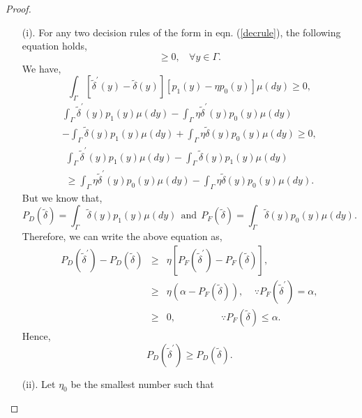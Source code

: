 \documentclass[a4paper,english,12pt]{article}
\begin{document}
\begin{proof}{}
\begin{itemize}
\item[(i).] For any two decision rules of the form in eqn. (\ref{decrule}), the following equation holds,
\begin{equation}
[\tilde{\delta}^{'} (y) - \tilde{\delta} (y) ][p_1(y) - \eta p_0(y)] \geq 0, ~~~~ \forall y\in \Gamma.
\end{equation}
We have,
\begin{equation}
\int_{\Gamma} [\tilde{\delta}^{'} (y) - \tilde{\delta} (y) ][p_1(y) - \eta p_0(y)]  \mu (dy) \geq 0, 
\end{equation}
\begin{multline}
\int_{\Gamma} \tilde{\delta}^{'} (y) p_1(y)  \mu (dy) - \int_{\Gamma} \eta \tilde{\delta}^{'} (y) p_0(y)  \mu (dy) \nonumber \\
- \int_{\Gamma} \tilde{\delta} (y) p_1(y)  \mu (dy) + \int_{\Gamma} \eta \tilde{\delta} (y) p_0(y)  \mu (dy) \geq 0,
\end{multline}
\begin{multline}
\int_{\Gamma} \tilde{\delta}^{'} (y) p_1(y)  \mu (dy) - \int_{\Gamma} \tilde{\delta} (y) p_1(y)  \mu (dy)  \\
\geq  \int_{\Gamma} \eta \tilde{\delta}^{'} (y) p_0(y)  \mu (dy)  - \int_{\Gamma} \eta \tilde{\delta} (y) p_0(y)  \mu (dy).
\end{multline}
But we know that, 
\begin{equation}
P_D(\tilde{\delta}) = \int_{\Gamma} \tilde{\delta}(y) p_1(y) \mu (dy) ~~ \mbox{and} ~~  P_F(\tilde{\delta}) = \int_{\Gamma} \tilde{\delta}(y) p_0(y) \mu (dy).
\end{equation}
Therefore, we can write the above equation as,
\begin{eqnarray}
\label{faineq}
P_D(\tilde{\delta}^{'}) - P_D(\tilde{\delta}) & \geq &  \eta [P_F(\tilde{\delta}^{'}) - P_F(\tilde{\delta})], \nonumber \\
& \geq & \eta (\alpha - P_F(\tilde{\delta})), ~~~~~ \because P_F(\tilde{\delta}^{'})  = \alpha, \nonumber \\
& \geq & 0, ~~~~~~~~~~~~~~~~~~~~~ \because P_F(\tilde{\delta})  \leq \alpha.
\end{eqnarray}
Hence,
\begin{equation}
P_D(\tilde{\delta}^{'}) \geq P_D(\tilde{\delta}).
\end{equation}
\item[(ii).] Let $\eta_0$ be the smallest number such that 

\end{itemize}
\end{proof}
\end{document}
